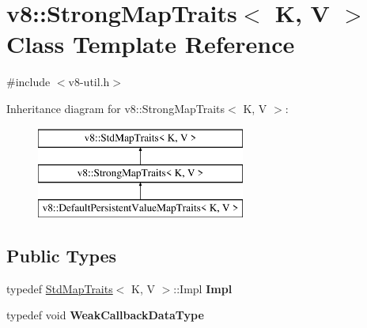 \hypertarget{classv8_1_1_strong_map_traits}{}\section{v8\+:\+:Strong\+Map\+Traits$<$ K, V $>$ Class Template Reference}
\label{classv8_1_1_strong_map_traits}


{\ttfamily \#include $<$v8-\/util.\+h$>$}

Inheritance diagram for v8\+:\+:Strong\+Map\+Traits$<$ K, V $>$\+:\begin{figure}[H]
\begin{center}
\leavevmode
\includegraphics[height=3.000000cm]{classv8_1_1_strong_map_traits}
\end{center}
\end{figure}
\subsection*{Public Types}
\begin{DoxyCompactItemize}
\item 
\hypertarget{classv8_1_1_strong_map_traits_a463c9be6409e9d249fbe2b0bb13f3002}{}typedef \hyperlink{classv8_1_1_std_map_traits}{Std\+Map\+Traits}$<$ K, V $>$\+::Impl {\bfseries Impl}\label{classv8_1_1_strong_map_traits_a463c9be6409e9d249fbe2b0bb13f3002}

\item 
\hypertarget{classv8_1_1_strong_map_traits_a049b390022e2e680534473a84c42951e}{}typedef void {\bfseries Weak\+Callback\+Data\+Type}\label{classv8_1_1_strong_map_traits_a049b390022e2e680534473a84c42951e}

\end{DoxyCompactItemize}
